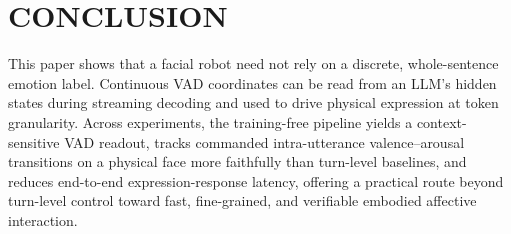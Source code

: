 \documentclass[letterpaper, 10 pt, conference]{ieeeconf/ieeeconf}
\begin{document}
\section{CONCLUSION}
\label{sec:conclusion}

This paper shows that a facial robot need not rely on a discrete, whole-sentence emotion label. Continuous VAD coordinates can be read from an LLM's hidden states during streaming decoding and used to drive physical expression at token granularity. Across experiments, the training-free pipeline yields a context-sensitive VAD readout, tracks commanded intra-utterance valence--arousal transitions on a physical face more faithfully than turn-level baselines, and reduces end-to-end expression-response latency, offering a practical route beyond turn-level control toward fast, fine-grained, and verifiable embodied affective interaction.



\end{document}
